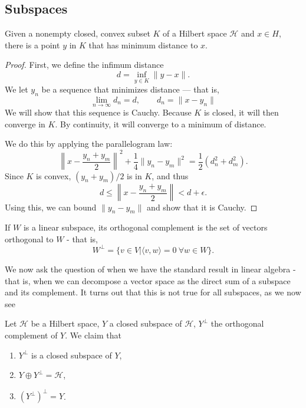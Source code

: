 \documentclass[twoside,symmetric, openany, 12pt]{./tuftebook}
\theoremstyle{definition}
\theoremstyle{definition}
\theoremstyle{definition}
\newenvironment{parts}{\begin{enumerate}[label=(\alph*)]}{\end{enumerate}}
\begin{document}
\subsection{Subspaces}
\begin{Theorem}\label{thm:convexminimizer}
	Given a nonempty closed, convex subset $K$ of a Hilbert space $\mathcal{H}$ and $x\in H$, there is a point $y$ in $K$ that has minimum distance to $x$.
\end{Theorem}
\begin{proof}
	First, we define the infimum distance
	\[d = \inf_{y\in K} \| y - x\|.\]
	We let $y_n$ be a sequence that minimizes distance --- that is, 
	\[\lim_{n\to\infty} d_n= d,\qquad d_n = \|x - y_n\|\]
	We will show that this sequence is Cauchy. Because $K$ is closed, it will then converge in $K$. By continuity, it will converge to a minimum of distance.
	
	We do this by applying the parallelogram law:
	\[\left\| x - \frac{y_n+y_m}{2}\right\|^2+\frac 14 \|y_n - y_m\|^2 = \frac 12 (d_n^2+d_m^2).\]
	Since $K$ is convex, $(y_n + y_m)/2$ is in $K$, and thus
	\[d \le \left\| x - \frac{y_n+y_m}{2}\right\| < d + \epsilon.\]
	Using this, we can bound $\|y_n - y_m\|$ and show that it is Cauchy.
\end{proof}
\begin{Definition}
	If $W$ is a linear subspace, its orthogonal complement is the set of vectors orthogonal to $W$ - that is,
	\[W^\perp = \{v\in V | \langle v, w\rangle = 0~\forall w\in W\}.\]
\end{Definition}
We now ask the question of when we have the standard result in linear algebra - that is, when we can decompose a vector space as the direct sum of a subspace and its complement. It turns out that this is not true for all subspaces, as we now see
\begin{Theorem}
	Let $\mathcal{H}$ be a Hilbert space, $Y$ a closed subspace of $\mathcal{H}$, $Y^\perp$ the orthogonal complement of $Y$. We claim that
	\begin{parts}
	\item $Y^\perp$ is a closed subspace of $Y$,
	\item $Y\oplus Y^\perp = \mathcal{H}$, 
	\item $(Y^\perp)^\perp = Y$.
	\end{parts}
\end{Theorem}
\end{document}
